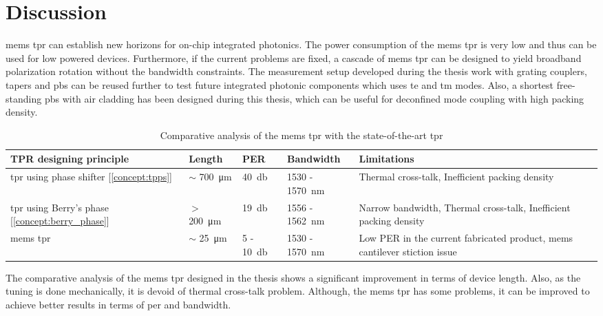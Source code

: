 \documentclass[../report.tex]{subfiles}
\begin{document}
	
	\chapter{Discussion}
\gls{mems} \gls{tpr} can establish new horizons for on-chip integrated photonics. The power consumption of the \gls{mems} \gls{tpr} is very low and thus can be used for low powered devices. Furthermore, if the current problems are fixed, a cascade of \gls{mems} \gls{tpr} can be designed to yield broadband polarization rotation without the bandwidth constraints. The measurement setup developed during the thesis work with grating couplers, tapers and \gls{pbs} can be reused further to test future integrated photonic components which uses \gls{te} and \gls{tm} modes. Also, a shortest free-standing \gls{pbs} with air cladding has been designed during this thesis, which can be useful for deconfined mode coupling with high packing density.
	
\begin {table}[H]
\begin{center} 
	\begin{tabular}{ | m{8em} | m{1.7cm}| m{1.7cm} | m{2.8cm} | m{10em} | }  
		\hline
		\textbf{TPR designing principle} & \textbf{Length} & \textbf{PER} & \textbf{Bandwidth} & \textbf{Limitations} \\ [1.5ex]
		\hline\hline
		\gls{tpr} using phase shifter [\ref{concept:tpps}] & $\sim$ \SI{700}{\micro \meter} & \SI{40}{\decibel} & 1530 - \SI{1570}{\nano \meter} & Thermal cross-talk, Inefficient packing density \\ 
		\hline	
		\gls{tpr} using Berry's phase [\ref{concept:berry_phase}] & $>$ \SI{200}{\micro \meter} & \SI{19}{\decibel} & 1556 - \SI{1562}{\nano \meter}  &  Narrow bandwidth, Thermal cross-talk, Inefficient packing density \\ 
		\hline
		\gls{mems} \gls{tpr} & $\sim$ \SI{25}{\micro \meter} & 5 - \SI{10}{\decibel} & 1530 - \SI{1570}{\nano \meter} & Low PER in the current fabricated product, \gls{mems} cantilever stiction issue \\ [1ex] 
		\hline
	\end{tabular}
\end{center}
\caption {Comparative analysis of the \gls{mems} \gls{tpr} with the state-of-the-art \gls{tpr}} \label{table:tpr_comparision} 
\end {table}

The comparative analysis of the \gls{mems} \gls{tpr} designed in the thesis shows a significant improvement in terms of device length. Also, as the tuning is done mechanically, it is devoid of thermal cross-talk problem.	Although, the \gls{mems} \gls{tpr} has some problems, it can be improved to achieve better results in terms of \gls{per} and bandwidth.
\end{document}
